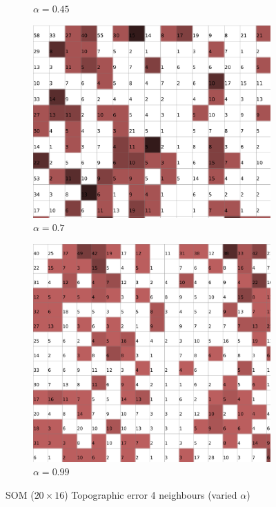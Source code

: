 \documentclass{acm_proc_article-sp}
\begin{document}
\begin{figure}
\begin{subfigure}[b]{0.24\linewidth}
        \caption{$\alpha=0.45$}
        \label{fig:wine-20x16-topographic-error-alpha-0,45}
    \end{subfigure}
    \begin{subfigure}[b]{0.24\linewidth}
        \includegraphics[width=\linewidth]{img/wine-20x16-topographic-error-alpha-0,7}
        \caption{$\alpha=0.7$}
        \label{fig:wine-20x16-topographic-error-alpha-0,7}
    \end{subfigure}
    \begin{subfigure}[b]{0.24\linewidth}
        \includegraphics[width=\linewidth]{img/wine-20x16-topographic-error-alpha-0,99}
        \caption{$\alpha=0.99$}
        \label{fig:wine-20x16-topographic-error-alpha-0,99}
    \end{subfigure}
    \caption{SOM ($20\times16$) Topographic error 4 neighbours (varied $\alpha$)}
    \label{fig:wine-20x16-topographic-error-alpha}
\end{figure}
\end{document}
